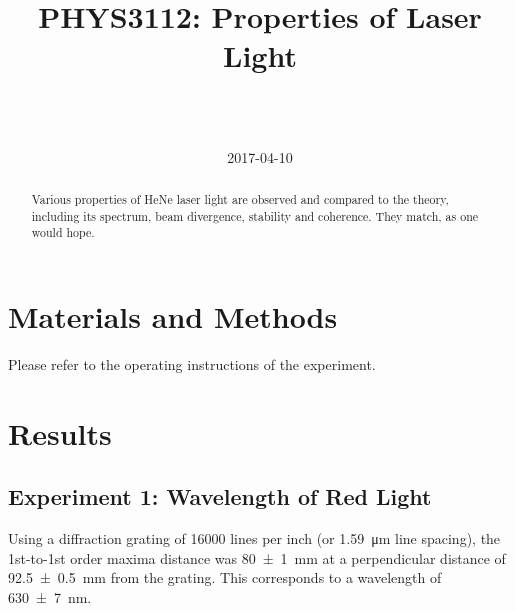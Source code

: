 \documentclass[a4paper]{scrartcl}
\begin{document}
\title{PHYS3112: Properties of Laser Light}
\author{ \\ \\ }
\date{2017-04-10}
\maketitle

\begin{abstract}
    Various properties of HeNe laser light are observed and compared to the theory, including its spectrum, beam divergence, stability and coherence. They match, as one would hope.
\end{abstract}

\section{Materials and Methods}
Please refer to the operating instructions of the experiment.

\section{Results}
\subsection{Experiment 1: Wavelength of Red Light}
Using a diffraction grating of 16000 lines per inch (or \SI{1.59}{\micro\metre} line spacing), the 1st-to-1st order maxima distance was \SI{80 \pm 1}{\milli\metre} at a perpendicular distance of \SI{92.5 \pm 0.5}{\milli\metre} from the grating. This corresponds to a wavelength of \SI{630 \pm 7}{\nano\metre}.
\end{document}
